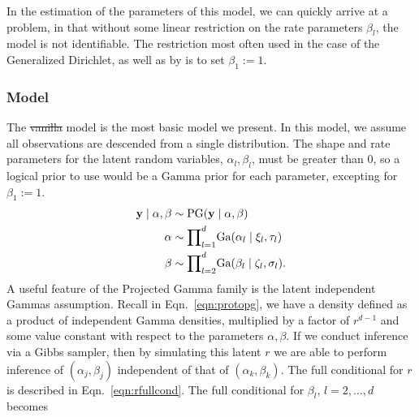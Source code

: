 In the estimation of the parameters of this model, we can quickly arrive at a problem, in that
  without some linear restriction on the rate parameters $\beta_l$, the model is not identifiable.
  The restriction most often used in the case of the Generalized Dirichlet, as well as by
  \cite{nunez2019} is to set $\beta_1 := 1$.

\subsubsection{  Model}
The \st{vanilla}  model is the most basic model we present.  In this model, we assume all observations
  are descended from a single distribution.  The shape and rate parameters for the latent
   random variables, $\alpha_l,\beta_l$, must be greater than 0, so a logical prior to
  use would be a Gamma prior for each parameter, excepting for $\beta_1 := 1$.
  \begin{equation}
    \label{eqn:vanillap}
    \begin{aligned}
      {\bf y}\mid\alpha,\beta &\sim \text{PG}({\bf y}\mid\alpha,\beta)\\
      {\bf \alpha} &\sim {\small \prod}_{l = 1}^d \text{Ga}(\alpha_l \mid \xi_l,\tau_l)\\
      {\bf \beta} &\sim {\small \prod}_{l = 2}^d \text{Ga}(\beta_l\mid \zeta_l,\sigma_l).
    \end{aligned}
  \end{equation}
  A useful feature of the Projected Gamma family is the latent independent Gammas assumption.  Recall
  in Eqn.~\ref{eqn:protopg}, we have a density defined as a product of independent Gamma densities,
  multiplied by a factor of $r^{d-1}$ and some value constant with respect to the parameters
  $\alpha,\beta$.  If we conduct inference via a Gibbs sampler, then by simulating this latent $r$
  we are able to perform inference of $(\alpha_j,\beta_j)$ independent of that of $(\alpha_k,\beta_k)$.
  The full conditional for $r$ is described in Eqn.~\ref{eqn:rfullcond}.  The full conditional for
  $\beta_l$, $l = 2,\ldots,d$ becomes
